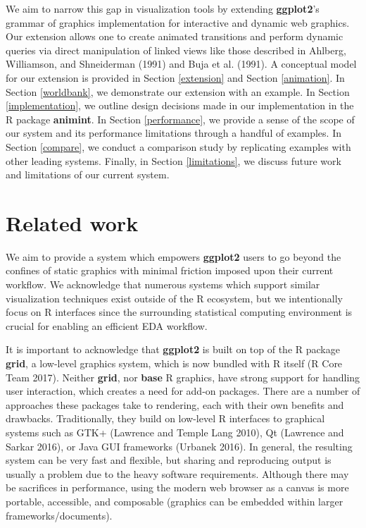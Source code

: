 \documentclass[12pt,]{article}
\theoremstyle{definition}
\theoremstyle{definition}
\theoremstyle{definition}
\theoremstyle{remark}
\begin{document}
We aim to narrow this gap in visualization tools by extending
\textbf{ggplot2}'s grammar of graphics implementation for interactive
and dynamic web graphics. Our extension allows one to create animated
transitions and perform dynamic queries via direct manipulation of
linked views like those described in Ahlberg, Williamson, and
Shneiderman (1991) and Buja et al. (1991). A conceptual model for our
extension is provided in Section \ref{extension} and Section
\ref{animation}. In Section \ref{worldbank}, we demonstrate our
extension with an example. In Section \ref{implementation}, we outline
design decisions made in our implementation in the R package
\textbf{animint}. In Section \ref{performance}, we provide a sense of
the scope of our system and its performance limitations through a
handful of examples. In Section \ref{compare}, we conduct a comparison
study by replicating examples with other leading systems. Finally, in
Section \ref{limitations}, we discuss future work and limitations of our
current system.

\hypertarget{related-work}{%
\section{Related work}\label{related-work}}

We aim to provide a system which empowers \textbf{ggplot2} users to go
beyond the confines of static graphics with minimal friction imposed
upon their current workflow. We acknowledge that numerous systems which
support similar visualization techniques exist outside of the R
ecosystem, but we intentionally focus on R interfaces since the
surrounding statistical computing environment is crucial for enabling an
efficient EDA workflow.

It is important to acknowledge that \textbf{ggplot2} is built on top of
the R package \textbf{grid}, a low-level graphics system, which is now
bundled with R itself (R Core Team 2017). Neither \textbf{grid}, nor
\textbf{base} R graphics, have strong support for handling user
interaction, which creates a need for add-on packages. There are a
number of approaches these packages take to rendering, each with their
own benefits and drawbacks. Traditionally, they build on low-level R
interfaces to graphical systems such as GTK+ (Lawrence and Temple Lang
2010), Qt (Lawrence and Sarkar 2016), or Java GUI frameworks (Urbanek
2016). In general, the resulting system can be very fast and flexible,
but sharing and reproducing output is usually a problem due to the heavy
software requirements. Although there may be sacrifices in performance,
using the modern web browser as a canvas is more portable, accessible,
and composable (graphics can be embedded within larger
frameworks/documents).
\end{document}
